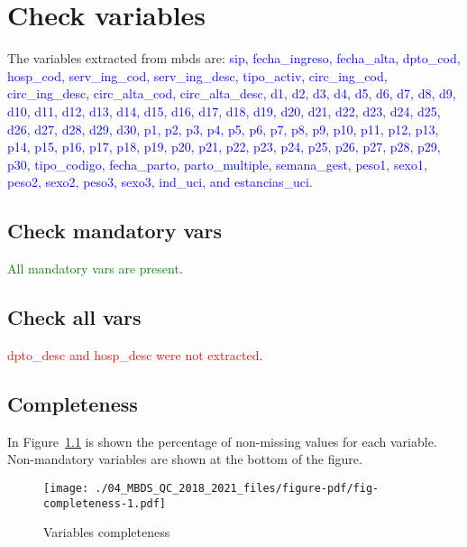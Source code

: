 \documentclass[
  letterpaper,
  DIV=11,
  numbers=noendperiod]{scrreprt}
\begin{document}
\hypertarget{check-variables-1}{%
\chapter{Check variables}\label{check-variables-1}}

The variables extracted from mbds are:
\textcolor{blue}{sip, fecha_ingreso, fecha_alta, dpto_cod, hosp_cod, serv_ing_cod, serv_ing_desc, tipo_activ, circ_ing_cod, circ_ing_desc, circ_alta_cod, circ_alta_desc, d1, d2, d3, d4, d5, d6, d7, d8, d9, d10, d11, d12, d13, d14, d15, d16, d17, d18, d19, d20, d21, d22, d23, d24, d25, d26, d27, d28, d29, d30, p1, p2, p3, p4, p5, p6, p7, p8, p9, p10, p11, p12, p13, p14, p15, p16, p17, p18, p19, p20, p21, p22, p23, p24, p25, p26, p27, p28, p29, p30, tipo_codigo, fecha_parto, parto_multiple, semana_gest, peso1, sexo1, peso2, sexo2, peso3, sexo3, ind_uci, and estancias_uci}.

\hypertarget{check-mandatory-vars-1}{%
\section{Check mandatory vars}\label{check-mandatory-vars-1}}

\textcolor{green}{All mandatory vars are present}.

\hypertarget{check-all-vars-1}{%
\section{Check all vars}\label{check-all-vars-1}}

\textcolor{red}{dpto_desc and hosp_desc were not extracted}.

\hypertarget{completeness-1}{%
\section{Completeness}\label{completeness-1}}

In Figure~\ref{fig-completeness} is shown the percentage of non-missing
values for each variable. Non-mandatory variables are shown at the
bottom of the figure.

\begin{figure}

{\centering \texttt{[image: ./04\_MBDS\_QC\_2018\_2021\_files/figure-pdf/fig-completeness-1.pdf]}

}

\caption{\label{fig-completeness}Variables completeness}

\end{figure}
\end{document}
